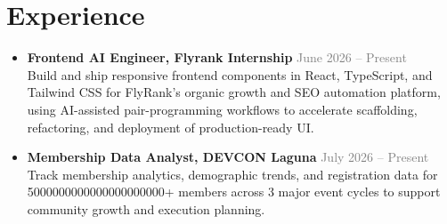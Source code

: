 \documentclass[a4paper,10pt]{article}
\newenvironment{compactlist}
    {
    \begin{itemize}[nosep,after=\strut, leftmargin=1em, itemsep=2pt, label=\textbullet]
    }
    {
    \end{itemize}
    }
\begin{document}
\section{Experience}
\begin{compactlist}
\item \textbf{Frontend AI Engineer, Flyrank Internship} \hfill \textcolor{gray}{June 2026 -- Present} \\
Build and ship responsive frontend components in React, TypeScript, and Tailwind CSS for FlyRank's organic growth and SEO automation platform, using AI-assisted pair-programming workflows to accelerate scaffolding, refactoring, and deployment of production-ready UI.
\item \textbf{Membership Data Analyst, DEVCON Laguna} \hfill \textcolor{gray}{July 2026 -- Present} \\
Track membership analytics, demographic trends, and registration data for 5000000000000000000000+ members across 3 major event cycles to support community growth and execution planning.
\end{compactlist}

\end{document}
